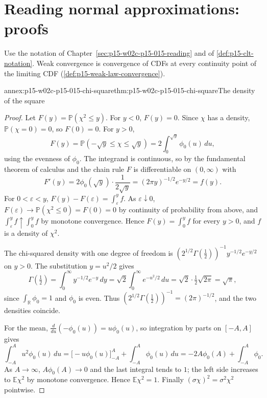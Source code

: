 \section{Reading normal approximations: proofs}
\label{sec:annex-p15-w02c-p15-015-reading}

Use the notation of Chapter~\ref{sec:p15-w02c-p15-015-reading} and of
\cref{def:p15-clt-notation}. Weak convergence is convergence of CDFs at
every continuity point of the limiting CDF
(\cref{def:p15-weak-law-convergence}).

\begin{annexitem}{annex:p15-w02c-p15-015-chi-square}{thm:p15-w02c-p15-015-chi-square}{The density of the square}
\begin{proof}
Let \(F(y)=\mathbb P(\chi^2\leq y)\). For \(y<0\), \(F(y)=0\). Since
\(\chi\) has a density, \(\mathbb P(\chi=0)=0\), so \(F(0)=0\). For
\(y>0\),
\[
 F(y)=\mathbb P(-\sqrt y\leq\chi\leq\sqrt y)
     =2\int_0^{\sqrt y}\phi_0(u)\,du,
\]
using the evenness of \(\phi_0\). The integrand is continuous, so by the
fundamental theorem of calculus and the chain rule \(F\) is
differentiable on \((0,\infty)\) with
\[
 F'(y)=2\phi_0(\sqrt y)\cdot\frac1{2\sqrt y}
      =(2\pi y)^{-1/2}e^{-y/2}=f(y).
\]
For \(0<\varepsilon<y\), \(F(y)-F(\varepsilon)=\int_\varepsilon^yf\).
As \(\varepsilon\downarrow0\), \(F(\varepsilon)\to\mathbb P(\chi^2\leq0)
=F(0)=0\) by continuity of probability from above, and
\(\int_\varepsilon^yf\uparrow\int_0^yf\) by monotone convergence. Hence
\(F(y)=\int_0^yf\) for every \(y>0\), and \(f\) is a density of
\(\chi^2\).

The chi-squared density with one degree of freedom is
\((2^{1/2}\Gamma(\tfrac12))^{-1}y^{-1/2}e^{-y/2}\) on \(y>0\). The
substitution \(y=u^2/2\) gives
\[
 \Gamma(\tfrac12)=\int_0^\infty y^{-1/2}e^{-y}\,dy
   =\sqrt2\int_0^\infty e^{-u^2/2}\,du
   =\sqrt2\cdot\tfrac12\sqrt{2\pi}=\sqrt\pi,
\]
since \(\int_{\mathbb R}\phi_0=1\) and \(\phi_0\) is even. Thus
\((2^{1/2}\Gamma(\tfrac12))^{-1}=(2\pi)^{-1/2}\), and the two
densities coincide.

For the mean, \(\frac{d}{du}(-\phi_0(u))=u\phi_0(u)\), so integration by
parts on \([-A,A]\) gives
\[
 \int_{-A}^Au^2\phi_0(u)\,du=\bigl[-u\phi_0(u)\bigr]_{-A}^{A}
   +\int_{-A}^A\phi_0(u)\,du
   =-2A\phi_0(A)+\int_{-A}^A\phi_0 .
\]
As \(A\to\infty\), \(A\phi_0(A)\to0\) and the last integral tends to
\(1\); the left side increases to \(\mathbb E\chi^2\) by monotone
convergence. Hence \(\mathbb E\chi^2=1\). Finally
\((\sigma\chi)^2=\sigma^2\chi^2\) pointwise.
\end{proof}
\end{annexitem}

